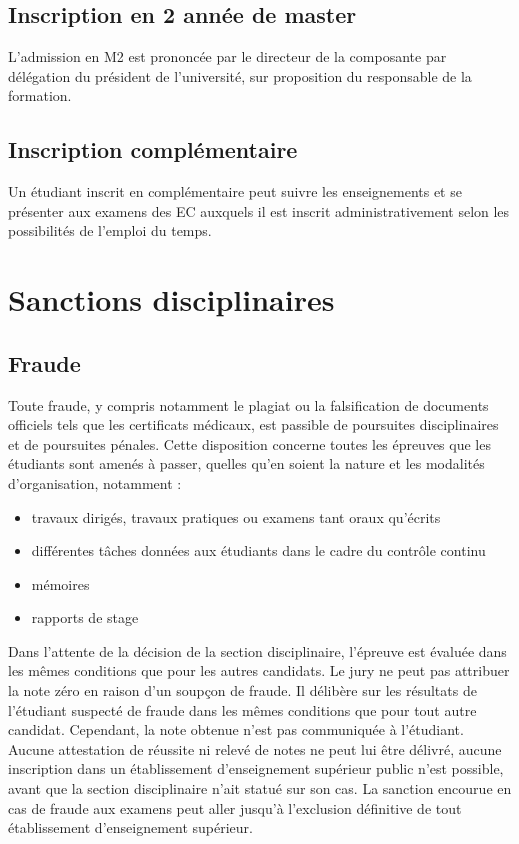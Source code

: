 \documentclass[a4paper,11pt]{article}
\begin{document}
\subsection{Inscription en 2\ieme{} année de master}
L'admission en M2 est prononcée par le directeur de la composante par délégation du président de l'université, sur proposition du responsable de la formation.

\subsection{Inscription complémentaire}
Un étudiant inscrit en complémentaire peut suivre les enseignements et se présenter aux examens des EC auxquels il est inscrit administrativement selon les possibilités de l'emploi du temps.


\section{Sanctions disciplinaires}

\subsection{Fraude}
Toute fraude, y compris notamment le plagiat ou la falsification de documents officiels tels que les certificats médicaux, est passible de poursuites disciplinaires et de poursuites pénales. Cette disposition concerne toutes les épreuves que les étudiants sont amenés à passer, quelles qu'en soient la nature et les modalités d'organisation, notamment :
\begin{itemize}
	\item travaux dirigés, travaux pratiques ou examens tant oraux qu'écrits
	\item différentes tâches données aux étudiants dans le cadre du contrôle continu
	\item mémoires
	\item rapports de stage
\end{itemize}

Dans l'attente de la décision de la section disciplinaire, l'épreuve est évaluée dans les mêmes conditions que pour les autres candidats. Le jury ne peut pas attribuer la note zéro en raison d'un soupçon de fraude. Il délibère sur les résultats de l'étudiant suspecté de fraude dans les mêmes conditions que pour tout autre candidat. Cependant, la note obtenue n'est pas communiquée à l'étudiant. Aucune attestation de réussite ni relevé de notes ne peut lui être délivré, aucune inscription dans un établissement d'enseignement supérieur public n'est possible, avant que la section disciplinaire n'ait statué sur son cas.
La sanction encourue en cas de fraude aux examens peut aller jusqu'à l'exclusion définitive de tout établissement d'enseignement supérieur.
\end{document}
